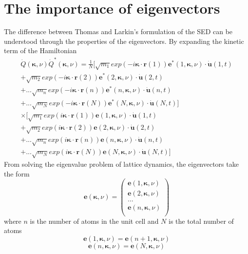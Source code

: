 \chapter{The importance of eigenvectors}

The difference between Thomas and Larkin's formulation of the SED can be understood through the properties of the eigenvectors. By expanding the kinetic term of the Hamiltonian
\begin{equation}
\begin{split}
\dot{Q}(\bm{\kappa},\nu)\dot{Q}^*(\bm{\kappa},\nu)=\frac{1}{N}[\sqrt{m_1}exp(-i\bm{\kappa}\cdot\bm{r}(1))\bm{e}^*(1,\bm{\kappa},\nu)\cdot\dot{\bm{u}}(1,t)\\
+\sqrt{m_2}exp(-i\bm{\kappa}\cdot\bm{r}(2))\bm{e}^*(2,\bm{\kappa},\nu)\cdot\dot{\bm{u}}(2,t)\\
+...\sqrt{m_n}exp(-i\bm{\kappa}\cdot\bm{r}(n))\bm{e}^*(n,\bm{\kappa},\nu)\cdot\dot{\bm{u}}(n,t)\\
+...\sqrt{m_N}exp(-i\bm{\kappa}\cdot\bm{r}(N))\bm{e}^*(N,\bm{\kappa},\nu)\cdot\dot{\bm{u}}(N,t)]\\
\times[\sqrt{m_1}exp(i\bm{\kappa}\cdot\bm{r}(1))\bm{e}(1,\bm{\kappa},\nu)\cdot\dot{\bm{u}}(1,t)\\
+\sqrt{m_2}exp(i\bm{\kappa}\cdot\bm{r}(2))\bm{e}(2,\bm{\kappa},\nu)\cdot\dot{\bm{u}}(2,t)\\
+...\sqrt{m_n}exp(i\bm{\kappa}\cdot\bm{r}(n))\bm{e}(n,\bm{\kappa},\nu)\cdot\dot{\bm{u}}(n,t)\\
+...\sqrt{m_N}exp(i\bm{\kappa}\cdot\bm{r}(N))\bm{e}(N,\bm{\kappa},\nu)\cdot\dot{\bm{u}}(N,t)]
\end{split}
\end{equation}
From solving the eigenvalue problem of lattice dynamics, the eigenvectors take the form
\[
\bm{e}(\bm{\kappa},\nu)=
\begin{pmatrix}
\bm{e}(1,\bm{\kappa},\nu)\\
\bm{e}(2,\bm{\kappa},\nu)\\
...\\
\bm{e}(n,\bm{\kappa},\nu)\\
\end{pmatrix}
\]
where $n$ is the number of atoms in the unit cell and $N$ is the total number of atoms
\begin{equation}
\bm{e}(1,\bm{\kappa},\nu)=\bm{e}(n+1,\bm{\kappa},\nu)
\end{equation}
\begin{equation}
\bm{e}(n,\bm{\kappa},\nu)=\bm{e}(N,\bm{\kappa},\nu)
\end{equation}
